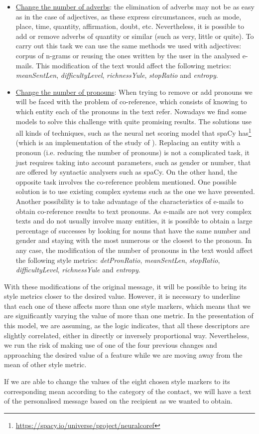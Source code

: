 \begin{itemize}
	\item\underline{Change the number of adverbs}: the elimination of adverbs may not be as easy as in the case of adjectives, as these express circumstances, such as mode, place, time, quantity, affirmation, doubt, etc. Nevertheless, it is possible to add or remove adverbs of quantity or similar (such as very, little or quite). To carry out this task we can use the same methods we used with adjectives: corpus of n-grams or reusing the ones written by the user in the analysed e-mails. This modification of the text would affect the following metrics: \textit{meanSentLen}, \textit{difficultyLevel}, \textit{richnessYule}, \textit{stopRatio} and \textit{entropy}.
	
	\item\underline{Change the number of pronouns}: When trying to remove or add pronouns we will be faced with the problem of co-reference, which consists of knowing to which entity each of the pronouns in the text refer. Nowadays we find some models to solve this challenge with quite promising results. The solutions use all kinds of techniques, such as the neural net scoring model that spaCy has\footnote{\url{https://spacy.io/universe/project/neuralcoref}} (which is an implementation of the study of \cite{clark2016deep}). Replacing an entity with a pronoun (i.e. reducing the number of pronouns) is not a complicated task, it just requires taking into account parameters, such as gender or number, that are offered by syntactic analysers such as spaCy. On the other hand, the opposite task involves the co-reference problem mentioned. One possible solution is to use existing complex systems such as the one we have presented. Another possibility is to take advantage of the characteristics of e-mails to obtain co-reference results to text pronouns. As e-mails are not very complex texts and do not usually involve many entities, it is possible to obtain a large percentage of successes by looking for nouns that have the same number and gender and staying with the most numerous or the closest to the pronoun. In any case, the modification of the number of pronouns in the text would affect the following style metrics: \textit{detPronRatio}, \textit{meanSentLen}, \textit{stopRatio}, \textit{difficultyLevel}, \textit{richnessYule} and \textit{entropy}.
\end{itemize}

With these modifications of the original message, it will be possible to bring its style metrics closer to the desired value. However, it is necessary to underline that each one of these affects more than one style markers, which means that we are significantly varying the value of more than one metric. In the presentation of this model, we are assuming, as the logic indicates, that all these descriptors are slightly correlated, either in directly or inversely proportional way. Nevertheless, we run the risk of making use of one of the four previous changes and approaching the desired value of a feature while we are moving away from the mean of other style metric.

If we are able to change the values of the eight chosen style markers to its corresponding mean according to the category of the contact, we will have a text of the personalised message based on the recipient as we wanted to obtain.